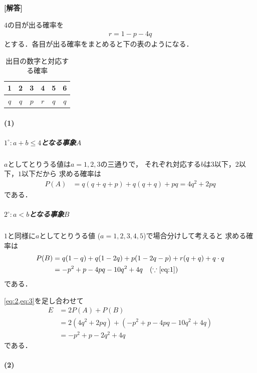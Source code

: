 \documentclass[../../main.tex]{subfiles}
\begin{document}
\begin{oframed}
  
\end{oframed}

{\bf [解答]}

$4$の目が出る確率を
\begin{align}
  r = 1 - p - 4q \label{eq:1}
\end{align}
とする．各目が出る確率をまとめると下の表のようになる．

\begin{table}[htb]
  \centering
  \caption{出目の数字と対応する確率}
  \begin{tabular}{|c|c|c|c|c|c|}
    \hline
    1 & 2 & 3 & 4 & 5 & 6 \\ \hline
    $q$ & $q$ & $p$ & $r$ & $q$ & $q$ \\ \hline
  \end{tabular}
\end{table}

\paragraph{(1)}

\subparagraph{$1^{\circ}: a+b\le 4$となる事象$A$}

$a$としてとりうる値は$a=1,2,3$の三通りで，
それぞれ対応する$b$は$3$以下，$2$以下，$1$以下だから
求める確率は
\begin{align}
  P(A)
  &= q(q+q+p) + q(q+q) + pq = 4q^2 + 2pq \label{eq:2}
\end{align}
である．

\subparagraph{$2^{\circ}: a<b$となる事象$B$}

$1$と同様に$a$としてとりうる値 ($a=1,2,3,4,5$)で場合分けして考えると
求める確率は
\begin{align}
  P(B)
  &= q(1-q) + q(1-2q) + p(1-2q-p) + r(q+q) + q \cdot q \\
  &= -p^2 + p - 4pq - 10q^2 + 4q \quad (\because \text{\cref{eq:1}}) \label{eq:3}
\end{align}
である．
\casesend

\cref{eq:2,eq:3}を足し合わせて
\begin{align}
  E
  &= 2P(A) + P(B) \\
  &= 2(4q^2 + 2pq) + (-p^2 + p - 4pq - 10q^2 + 4q) \\
  &= -p^2 + p - 2q^2 + 4q \label{eq:4}
\end{align}
である．

\paragraph{(2)}
\end{document}
